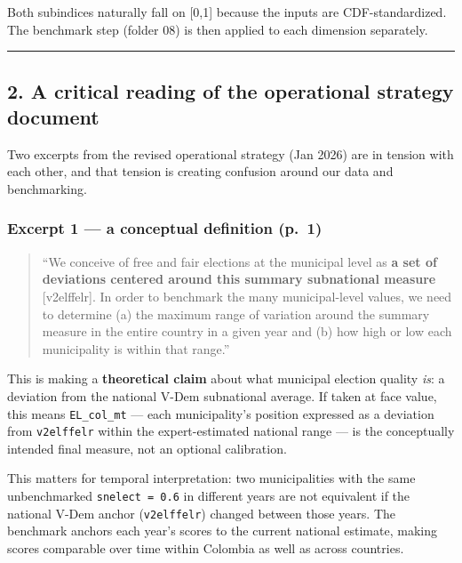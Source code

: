 \documentclass[
]{article}
\begin{document}
Both subindices naturally fall on {[}0,1{]} because the inputs are
CDF-standardized. The benchmark step (folder 08) is then applied to each
dimension separately.

\begin{center}\rule{0.5\linewidth}{0.5pt}\end{center}

\subsection{2. A critical reading of the operational strategy
document}\label{a-critical-reading-of-the-operational-strategy-document}

Two excerpts from the revised operational strategy (Jan 2026) are in
tension with each other, and that tension is creating confusion around
our data and benchmarking.

\subsubsection{Excerpt 1 --- a conceptual definition
(p.~1)}\label{excerpt-1-a-conceptual-definition-p.-1}

\begin{quote}
``We conceive of free and fair elections at the municipal level as
\textbf{a set of deviations centered around this summary subnational
measure} {[}v2elffelr{]}. In order to benchmark the many municipal-level
values, we need to determine (a) the maximum range of variation around
the summary measure in the entire country in a given year and (b) how
high or low each municipality is within that range.''
\end{quote}

This is making a \textbf{theoretical claim} about what municipal
election quality \emph{is}: a deviation from the national V-Dem
subnational average. If taken at face value, this means
\texttt{EL\_col\_mt} --- each municipality's position expressed as a
deviation from \texttt{v2elffelr} within the expert-estimated national
range --- is the conceptually intended final measure, not an optional
calibration.

This matters for temporal interpretation: two municipalities with the
same unbenchmarked \texttt{snelect\ =\ 0.6} in different years are not
equivalent if the national V-Dem anchor (\texttt{v2elffelr}) changed
between those years. The benchmark anchors each year's scores to the
current national estimate, making scores comparable over time within
Colombia as well as across countries.
\end{document}
